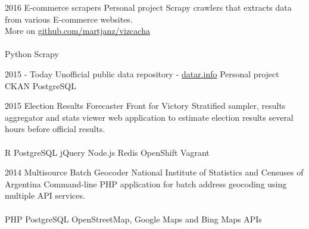 \documentclass[]{cv-style}          %
\begin{document}
\begin{entrylist}
\entry
{2016}
{E-commerce scrapers}
{Personal project}
{Scrapy crawlers that extracts data from various E-commerce websites.\\
More on \href{https://github.com/martjanz/vizcacha}{github.com/martjanz/vizcacha}\\
\\
Python \textbullet{} Scrapy\\

}
{\vspace{-0.3cm}}
\end{entrylist}

\begin{entrylist}
\entry
{2015 - Today}
{Unofficial public data repository - \href{http://datar.info}{datar.info}}
{Personal project}
{\\
CKAN \textbullet{} PostgreSQL}
{\vspace{-0.3cm}}
\end{entrylist}

\begin{entrylist}
\entry
{2015}
{Election Results Forecaster}
{Front for Victory}
{Stratified sampler, results aggregator and stats viewer web application 
to estimate election results several hours before official results.\\
\\
R \textbullet{} PostgreSQL \textbullet{} jQuery \textbullet{} 
Node.js \textbullet{} Redis \textbullet{} OpenShift \textbullet{} Vagrant
}
{\vspace{-0.3cm}}
\end{entrylist}

\begin{entrylist}
\entry
{2014}
{Multisource Batch Geocoder}
{National Institute of Statistics and Censuses of Argentina}
{Command-line PHP application for batch address geocoding using multiple API services.\\
\\
PHP \textbullet{} PostgreSQL \textbullet{} OpenStreetMap, Google Maps and Bing Maps APIs
}
{\vspace{-0.3cm}}
\end{entrylist}

{\vspace{1.5cm}}
\end{document}
